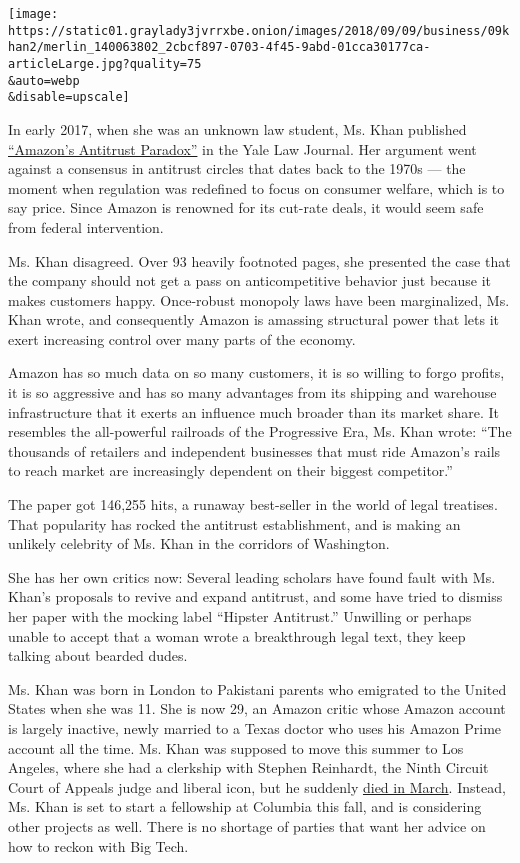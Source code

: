 \texttt{[image: https://static01.graylady3jvrrxbe.onion/images/2018/09/09/business/09khan2/merlin\_140063802\_2cbcf897-0703-4f45-9abd-01cca30177ca-articleLarge.jpg?quality=75\\\&auto=webp\\\&disable=upscale]}

In early 2017, when she was an unknown law student, Ms. Khan published
\href{https://www.yalelawjournal.org/note/amazons-antitrust-paradox}{``Amazon's
Antitrust Paradox''} in the Yale Law Journal. Her argument went against
a consensus in antitrust circles that dates back to the 1970s --- the
moment when regulation was redefined to focus on consumer welfare, which
is to say price. Since Amazon is renowned for its cut-rate deals, it
would seem safe from federal intervention.

Ms. Khan disagreed. Over 93 heavily footnoted pages, she presented the
case that the company should not get a pass on anticompetitive behavior
just because it makes customers happy. Once-robust monopoly laws have
been marginalized, Ms. Khan wrote, and consequently Amazon is amassing
structural power that lets it exert increasing control over many parts
of the economy.

Amazon has so much data on so many customers, it is so willing to forgo
profits, it is so aggressive and has so many advantages from its
shipping and warehouse infrastructure that it exerts an influence much
broader than its market share. It resembles the all-powerful railroads
of the Progressive Era, Ms. Khan wrote: ``The thousands of retailers and
independent businesses that must ride Amazon's rails to reach market are
increasingly dependent on their biggest competitor.''

The paper got 146,255 hits, a runaway best-seller in the world of legal
treatises. That popularity has rocked the antitrust establishment, and
is making an unlikely celebrity of Ms. Khan in the corridors of
Washington.

She has her own critics now: Several leading scholars have found fault
with Ms. Khan's proposals to revive and expand antitrust, and some have
tried to dismiss her paper with the mocking label ``Hipster Antitrust.''
Unwilling or perhaps unable to accept that a woman wrote a breakthrough
legal text, they keep talking about bearded dudes.

Ms. Khan was born in London to Pakistani parents who emigrated to the
United States when she was 11. She is now 29, an Amazon critic whose
Amazon account is largely inactive, newly married to a Texas doctor who
uses his Amazon Prime account all the time. Ms. Khan was supposed to
move this summer to Los Angeles, where she had a clerkship with Stephen
Reinhardt, the Ninth Circuit Court of Appeals judge and liberal icon,
but he suddenly
\href{https://www.nytimes3xbfgragh.onion/2018/04/02/obituaries/stephen-reinhardt-liberal-lion-of-federal-court-dies-at-87.html}{died
in March}. Instead, Ms. Khan is set to start a fellowship at Columbia
this fall, and is considering other projects as well. There is no
shortage of parties that want her advice on how to reckon with Big Tech.

